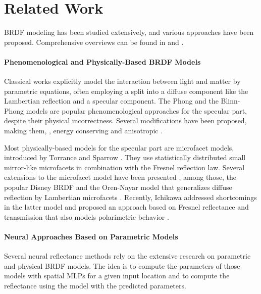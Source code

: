 \section{Related Work}
BRDF modeling has been studied extensively, and various approaches have been proposed. Comprehensive overviews can be found in \cite{montes2012overviewBRDFModels} and \cite{Guarnera2016BRDFRepresentationAcquisition}. 

\paragraph{Phenomenological and Physically-Based BRDF Models}
Classical works explicitly model the interaction between light and matter by parametric equations, often employing a split into a diffuse component like the Lambertian reflection \cite{Lamber1760} and a specular component. The Phong and the Blinn-Phong models \cite{Phong75,Blinn77} are popular phenomenological approaches for the specular part, despite their physical incorrectness. Several modifications have been proposed, making them, \eg, energy conserving and anisotropic \cite{lafortune1994using,Ashikhmin00AnAnisotropicPhongBRDFModel}.

Most physically-based models for the specular part are microfacet models, introduced by Torrance and Sparrow \cite{torrance1967theory}. They use statistically distributed small mirror-like microfacets in combination with the Fresnel reflection law.
Several extensions to the microfacet model have been presented
\cite{CookTorranceT82,trowbridge1975average,walter2007microfacet,smith1967geometrical,schlick1994inexpensive,Holzschuch17ATwoScaleMicrofacetReflectanceModel}, among those, the popular Disney BRDF \cite{burley2012physically} and the Oren-Nayar model that generalizes diffuse reflection by Lambertian microfacets \cite{Oren94OrenNayar}.
Recently,  Ichikawa \etal addressed shortcomings in the latter model and proposed an approach based on Fresnel reflectance and transmission that also models polarimetric behavior \cite{ichikawa2023fresnel}.

\paragraph{Neural Approaches Based on Parametric Models}
Several neural reflectance methods rely on the extensive research on parametric and physical BRDF models. The idea is to compute the parameters of those models with spatial MLPs for a given input location and to compute the reflectance using the model with the predicted parameters.

